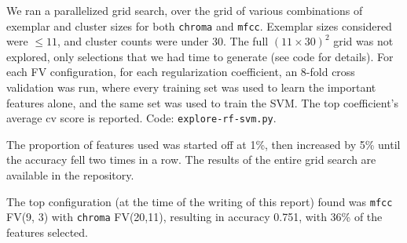 \documentclass{article}
\begin{document}
We ran a parallelized grid search, over the grid of various combinations of exemplar and cluster sizes for both \texttt{chroma} and \texttt{mfcc}. Exemplar sizes considered were $\le 11$, and cluster counts were under 30. The full $(11\times 30)^2$ grid was not explored, only selections that we had time to generate (see code for details). For each FV configuration, for each regularization coefficient, an 8-fold cross validation was run, where every training set was used to learn the important features alone, and the same set was used to train the SVM. The top coefficient's average cv score is reported. Code: \texttt{explore-rf-svm.py}.

The proportion of features used was started off at 1\%, then increased by 5\% until the accuracy fell two times in a row. The results of the entire grid search are available in the repository.

The top configuration (at the time of the writing of this report) found was \texttt{mfcc} FV(9, 3) with \texttt{chroma} FV(20,11), resulting in accuracy 0.751, with 36\% of the features selected.
\end{document}
